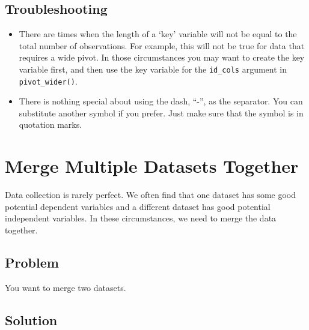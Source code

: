 \documentclass[
]{book}
\providecommand{\tightlist}{%
  \setlength{\itemsep}{0pt}\setlength{\parskip}{0pt}}
\begin{document}
\hypertarget{troubleshooting-24}{%
\subsection{Troubleshooting}\label{troubleshooting-24}}

\begin{itemize}
\tightlist
\item
  There are times when the length of a `key' variable will not be equal to the total number of observations. For example, this will not be true for data that requires a wide pivot. In those circumstances you may want to create the key variable first, and then use the key variable for the \texttt{id\_cols} argument in \texttt{pivot\_wider()}.
\item
  There is nothing special about using the dash, ``-'', as the separator. You can substitute another symbol if you prefer. Just make sure that the symbol is in quotation marks.
\end{itemize}

\hypertarget{merge}{%
\section{Merge Multiple Datasets Together}\label{merge}}

Data collection is rarely perfect. We often find that one dataset has some good potential dependent variables and a different dataset has good potential independent variables. In these circumstances, we need to merge the data together.

\hypertarget{problem-28}{%
\subsection{Problem}\label{problem-28}}

You want to merge two datasets.

\hypertarget{solution-27}{%
\subsection{Solution}\label{solution-27}}
\end{document}
